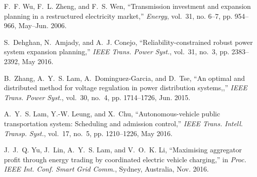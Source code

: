 \documentclass[journal]{IEEEtran}
\begin{document}
\begin{thebibliography}{1}
F.~F. Wu, F.~L. Zheng, and F.~S. Wen, ``Transmission investment and expansion
  planning in a restructured electricity market,'' \emph{Energy}, vol.~31, no.
  6--7, pp. 954--966, May--Jun. 2006.

S.~Dehghan, N.~Amjady, and A.~J. Conejo, ``Reliability-constrained robust power
  system expansion planning,'' \emph{{IEEE} Trans. Power Syst.}, vol.~31,
  no.~3, pp. 2383--2392, May 2016.

B.~Zhang, A.~Y.~S. Lam, A.~Dominguez-Garcia, and D.~Tse, ``An optimal and
  distributed method for voltage regulation in power distribution systems,,''
  \emph{{IEEE} Trans. Power Syst.}, vol.~30, no.~4, pp. 1714--1726, Jun. 2015.

A.~Y.~S. Lam, Y.-W. Leung, and X.~Chu, ``Autonomous-vehicle public
  transportation system: Scheduling and admission control,'' \emph{{IEEE}
  Trans. Intell. Transp. Syst.}, vol.~17, no.~5, pp. 1210--1226, May 2016.

J.~J.~Q. Yu, J.~Lin, A.~Y.~S. Lam, and V.~O.~K. Li, ``Maximising aggregator
  profit through energy trading by coordinated electric vehicle charging,'' in
  \emph{Proc. IEEE Int. Conf. Smart Grid Comm.}, Sydney, Australia, Nov. 2016.
\end{thebibliography}
\end{document}
